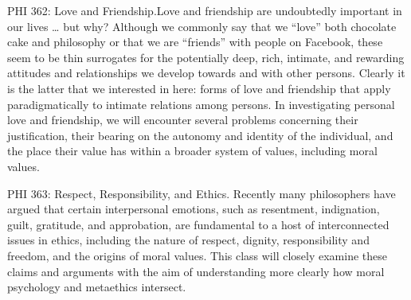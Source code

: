 \documentclass[%
  11pt,%
]{article}
\begin{document}
\begin{htmlcourse}{PHI 362: Love and Friendship.}{Love and friendship are undoubtedly important in our lives \dots{} but why? Although we commonly say that we \enquote{love} both chocolate cake and philosophy or that we are \enquote{friends} with people on Facebook, these seem to be thin surrogates for the potentially deep, rich, intimate, and rewarding attitudes and relationships we develop towards and with other persons. Clearly it is the latter that we interested in here: forms of love and friendship that apply paradigmatically to intimate relations among persons. In investigating personal love and friendship, we will encounter several problems concerning their justification, their bearing on the autonomy and identity of the individual, and the place their value has within a broader system of values, including moral values.}\end{htmlcourse}

\begin{htmlcourse}{PHI 363: Respect, Responsibility, and Ethics.}
  Recently many philosophers have argued that certain interpersonal emotions, such as resentment, indignation, guilt, gratitude, and approbation, are fundamental to a host of interconnected issues in ethics, including the nature of respect, dignity, responsibility and freedom, and the origins of moral values. This class will closely examine these claims and arguments with the aim of understanding more clearly how moral psychology and metaethics intersect.
\end{htmlcourse}

\ifdefined\HCode
\else
\fi
\end{document}
